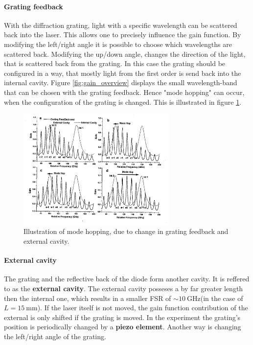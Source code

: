 \paragraph{Grating feedback}
With the diffraction grating, light with a specific wavelength
can be scattered back into the laser. This allows one to precisely
influence the gain function. By modifying the left/right angle
it is possible to choose which wavelengths are scattered back.
Modifying the up/down angle, changes the direction of the light,
that is scattered back from the grating.
In this case the grating
should be configured in a way, that mostly light from
the first order is send back into the internal cavity.
Figure \ref{fig:gain_overview}
displays the small wavelength-band that can be chosen with
the grating feedback. Hence  "mode hopping" can occur,
when the configuration of the grating is changed. This is illustrated
in figure \ref{fig:mode_hops}.


\FloatBarrier
\begin{figure}
  \centering
  \includegraphics[width=0.7\textwidth]{mode_hops.png}
  \caption{Illustration of mode hopping, due to change in grating feedback and external cavity.\cite{V60}}
  \label{fig:mode_hops}
\end{figure}
\FloatBarrier




\paragraph{External cavity}
The grating and the reflective back of the diode form another
cavity. It is reffered to as the \textbf{external cavity}.
The external cavity posseses a by far greater length then
the internal one, which results in a
smaller FSR of
$\sim \SI{10}{\giga\hertz}$(in the case of $L = \SI{15}{\milli\meter}$).
If the laser itself is not moved, the gain function
contribution of the external is only shifted if the grating
is moved. In the experiment the grating's position
is periodically changed by a \textbf{piezo element}. Another way is
changing the left/right angle of the grating.







